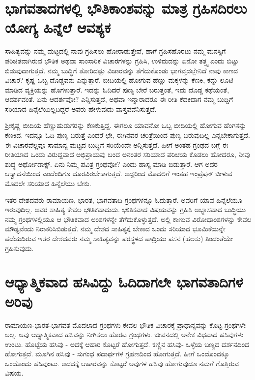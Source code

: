 \section*{ಭಾಗವತಾದಗಳಲ್ಲಿ ಭೌತಿಕಾಂಶವನ್ನು ಮಾತ್ರ ಗ್ರಹಿಸದಿರಲು ಯೋಗ್ಯ ಹಿನ್ನೆಲೆ ಆವಶ್ಯಕ}

ಸಾಹಿತ್ಯವನ್ನು ನಮ್ಮ ಮಟ್ಟದಲ್ಲಿ ನಾವು ಗ್ರಹಿಸಲು ಹೋರಾಡುತ್ತೇವೆ, ಹಾಗೆ ಗ್ರಹಿಸಹೊರಟು ನಮ್ಮ ಮನಸ್ಸಿಗೆ ಪರಿಚಿತವಾಗಿರುವ ಭೌತಿಕ ಅಥವಾ ಸಾಂಸಾರಿಕ ವಿಚಾರಗಳನ್ನು ಗ್ರಹಿಸಿ, ಉಳಿದುದನ್ನು ಏನೋ ತತ್ತ್ವ ಎಂದು ಬಿಟ್ಟು ಬಿಡುವುದಾಗುತ್ತದೆ. ನಮ್ಮ ಬುದ್ಧಿಗೆ ತೋರಿದಷ್ಟು ವಿಚಾರವನ್ನು ತೆಗೆದುಕೊಂಡು ಭಾಗವ್ತದಲ್ಲೇನಿದೆ ನಾವು ಕಾಣದ ವಿಚಾರ? ಕೃಷ್ಣ ಒಬ್ಬ ದೊಡ್ಡವನು ಎನ್ನುತ್ತಾರೆ. ಬೀದಿಯಲ್ಲಿ ಹೋಗುವ ಹೆಣ್ಣು ಮಕ್ಕಳನ್ನು ಕೆಣಕಿ, ಕದ್ದು ಲೂಟಿ ಮಾಡಿದ ವ್ಯಕ್ತಿಯನ್ನು ಹೊಗಳುತ್ತಾರೆ. ಇದನ್ನು ಓದಿದರೆ ಪುಣ್ಯ ಬೇರೆ ಬರುತ್ತಂತೆ, ಇದು ದೊಡ್ಡ ಕಥೆಯಂತೆ, ಆದರ್ಶವಂತೆ. ಏನು ಆದರ್ಶವೋ? ಎನ್ನಿಸುತ್ತದೆ, ಅಥವಾ ಇನ್ನಾರಾದರೂ ಈ ರೀತಿ ಕೆದಕಿದಾಗ ನಮ್ಮ ಬುದ್ದಿಗೆ ಸರಿಯಾದ ಹಿನ್ನೆಲೆಯಿಲ್ಲದಿದ್ದರೆ ಅವರು ಹೇಳುವುದು ವಾಸ್ತವವೆನಿಸುತ್ತದೆ.

ಶ್ರೀಕೃಷ್ಣ ಬೀದಿಯ ಹೆಣ್ಣುಹುಡುಗರನ್ನು ಕೆಣಕುತ್ತಿದ್ದ. ಈಗಲೂ ಯಾವನೋ ಒಬ್ಬ ಬೀದಿಯಲ್ಲಿ ಹೋಗುವ ಹೆಂಗಸನ್ನು ಕೆಣಕಿದ. ಇದನ್ನೂ ಓದಿ ಪುಣ್ಯ ಬರುತ್ತೆ ಎಂದರೆ ಛೇ, ಈಗಿನವರ ಚರಿತ್ರೆಯಿಂದ ಪುಣ್ಯ ಬರುವುದಿಲ್ಲ ಎನ್ನಬೇಕಾಗುತ್ತದೆ. ಈ ವಿಚಾರವೆಲ್ಲವೂ ಸಾಮಾನ್ಯ ಮಟ್ಟದ ಬುದ್ಧಿಗೆ ಸರಿಯೆಂದೇ ಅನ್ನಿಸುತ್ತದೆ. ಹೀಗೆ ಅಂತಹ ಗ್ರಂಥದ ಬಗ್ಗೆ ಈ ರೀತಿಯಾದ ಒಂದು ವಿರುದ್ದವಾದ ಅಭಿಪ್ರಾಯವು ಬಂದ ಅನಂತರ ಸರಿಯಾದ ಪರಿಚಯ ಕೊಡಲು ಹೋದರೂ, ನೀವು ಶುದ್ಧ ಅರ್ಥೋಡಾಕ್ಸ್. ಏನು ನಿಮ್ಮ ಪವಿತ್ರ ಗ್ರಂಥವೋ? ಎಂದು ಹಾಸ್ಯ ಮಾಡಿ ಬಿಡುತ್ತಾರೆ. ಆಗ ಅದರ ಆಸ್ವಾದನೆಯಿಂದ ಎಂದೆಂದಿಗೂ ದೂರವಿರಬೇಕಾಗುತ್ತದೆ. ಅದ್ದರಿಂದ ಮೊದಲಿಗೆ ಇಂತಹ ಇಂಪ್ರೆಷನ್ ಬೀಳುವ ಮೊದಲೇ ಸರಿಯಾದ ಹಿನ್ನೆಲೆಯು ಬೇಕು.

ಇತರ ದೇಶದವರು ರಾಮಾಯಣ, ಭಾರತ, ಭಾಗವತಾದಿ ಗ್ರಂಥಗಳನ್ನೂ ಓದುತ್ತಾರೆ. ಅವರಿಗೆ ಯಾವ ಹಿನ್ನೆಲೆಯೂ ಇರುವುದಿಲ್ಲ. ಅವರ ಸಾಹಿತ್ಯ ಕೇವಲ ಭೌತಿಕವಾದುದು. ಭೌತಿಕವಾದ ವಿಷಯವನ್ನು ಗ್ರಹಿಸಿ ಅಭ್ಯಾಸವಾದ ಬುದ್ಧಿಯು ನಮ್ಮ ಗ್ರಂಥಗಳಲ್ಲಿಯೂ ಆ ಭೌತಿಕವಾದ ಅಂಶಗಳನ್ನೇ ತೆಗೆದುಕೊಳ್ಳುತ್ತದೆ. ಅಲ್ಲಿ ಕಾಣುವ ವಿರೋಧಾಂಶಗಳನ್ನು ಕೇವಲ ಮೌಢ್ಯವೆಂದು ನಿರಾಕರಿಸಿಬಿಡುತ್ತದೆ. ನಮ್ಮ ದೇಶದ ಸಾಹಿತ್ಯಕ್ಕೆ ಬೇಕಾದ ಒಂದು ಸರಿಯಾದ ಭೂಮಿಕೆಯನ್ನೇ ಪಡೆಯದಿರುವ ಇತರ ದೇಶದವರು ನಮ್ಮ ಸಾಹಿತ್ಯವನ್ನು ಪರಸ್ಥಳದ ಪಾದ್ರಿಯು ಪಸನ (ಹಲಸು) ತಿಂದಂತೆಯೇ ಗ್ರಹಿಸುವುದು.

\section*{ಆಧ್ಯಾತ್ಮಿಕವಾದ ಹಸಿವಿದ್ದು ಓದಿದಾಗಲೇ ಭಾಗವತಾದಿಗಳ ಅರಿವು}

ರಾಮಾಯಣ-ಭಾರತ-ಭಾಗವತ ಮೊದಲಾದ ಗ್ರಂಥಗಳು ಕೇವಲ ಭೌತಿಕ ವಿಚಾರಕ್ಕೆ ಪ್ರಾಧಾನ್ಯವನ್ನು ಕೊಟ್ಟ ಗ್ರಂಥಗಳೇ ಅಲ್ಲ. ಅವು ಆಧ್ಯಾತ್ಮಿಕವಾದ ಹಸಿವನ್ನು ನೀಗಿಸಲು ಹೊರಟ ಗ್ರಂಥಗಳು. ಜೀವನದಲ್ಲಿ ಅನೇಕ ವಿಧವಾದ ಹಸಿವುಗಳು ಉಂಟು. ಹೊಟ್ಟೆಯ ಹಸಿವು - ಅದಕ್ಕೆ ಆಹಾರ ಕೊಟ್ಟರೆ ಹೋಗುತ್ತದೆ. ಕಣ್ಣಿನ ಹಸಿವು- ಒಳ್ಳೆಯ ಬಣ್ಣದ ದರ್ಶನದಿಂದ ಹೋಗುತ್ತದೆ. ಮೂಗಿನ ಹಸಿವು - ಸುಗಂಧ ಪದಾರ್ಥಗಳ ಗ್ರಹಣದಿಂದ ಹೋಗುತ್ತದೆ. ಹೀಗೆ ಒಂದೊಂದಕ್ಕೂ ಒಂದೊಂದು ಹಸಿವುಂಟು. ಅದದಕ್ಕೆ ಆಹಾರವನ್ನು ಕೊಟ್ಟರೆ ಅವುಗಳ ಹಸಿವು ಹೋಗುವುದೂ ನಮಗೆ ಗೊತ್ತಿರುವ ವಿಷಯ. 

